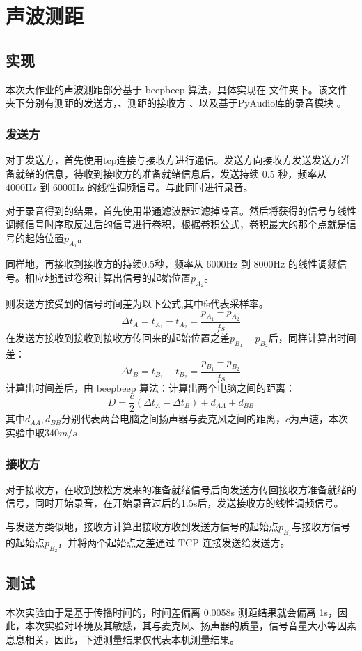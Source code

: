 \section{声波测距}
\subsection{实现}
本次大作业的声波测距部分基于 beepbeep 算法，具体实现在  文件夹下。该文件夹下分别有测距的发送方，、测距的接收方 、以及基于PyAudio库的录音模块 。 
\subsubsection{发送方}
对于发送方，首先使用tcp连接与接收方进行通信。发送方向接收方发送发送方准备就绪的信息，待收到接收方的准备就绪信息后，发送持续 0.5 秒，频率从 4000Hz 到 6000Hz 的线性调频信号。与此同时进行录音。

对于录音得到的结果，首先使用带通滤波器过滤掉噪音。然后将获得的信号与线性调频信号时序取反过后的信号进行卷积，根据卷积公式，卷积最大的那个点就是信号的起始位置$p_{A_1}$。

同样地，再接收到接收方的持续0.5秒，频率从 6000Hz 到 8000Hz 的线性调频信号。相应地通过卷积计算出信号的起始位置$p_{A_2}$。

则发送方接受到的信号时间差为以下公式,其中fs代表采样率。
$$
\Delta t_A = t_{A_1} - t_{A_2}=\frac{p_{A_1}-p_{A_2}}{fs}
$$
在发送方接收到接收到接收方传回来的起始位置之差$p_{B_1}-p_{B_2}$后，同样计算出时间差：
$$
\Delta t_B = t_{B_1} - t_{B_2}=\frac{p_{B_1}-p_{B_2}}{fs}
$$
计算出时间差后，由 beepbeep 算法：计算出两个电脑之间的距离：
$$
D = \frac{c}{2}(\Delta t_A - \Delta t_B) + d_{AA} + d_{BB}
$$
其中$d_{AA} , d_{BB}$分别代表两台电脑之间扬声器与麦克风之间的距离，$c$为声速，本次实验中取$340m/s$
\subsubsection{接收方}
对于接收方，在收到放松方发来的准备就绪信号后向发送方传回接收方准备就绪的信号，同时开始录音，在开始录音过后的1.5s后，发送接收方的线性调频信号。

与发送方类似地，接收方计算出接收方收到发送方信号的起始点$p_{B_1}$与接收方信号的起始点$p_{B_2}$，并将两个起始点之差通过 TCP 连接发送给发送方。

\newpage

\subsection{测试}
本次实验由于是基于传播时间的，时间差偏离 0.0058s 测距结果就会偏离 1s，因此，本次实验对环境及其敏感，其与麦克风、扬声器的质量，信号音量大小等因素息息相关，因此，下述测量结果仅代表本机测量结果。

